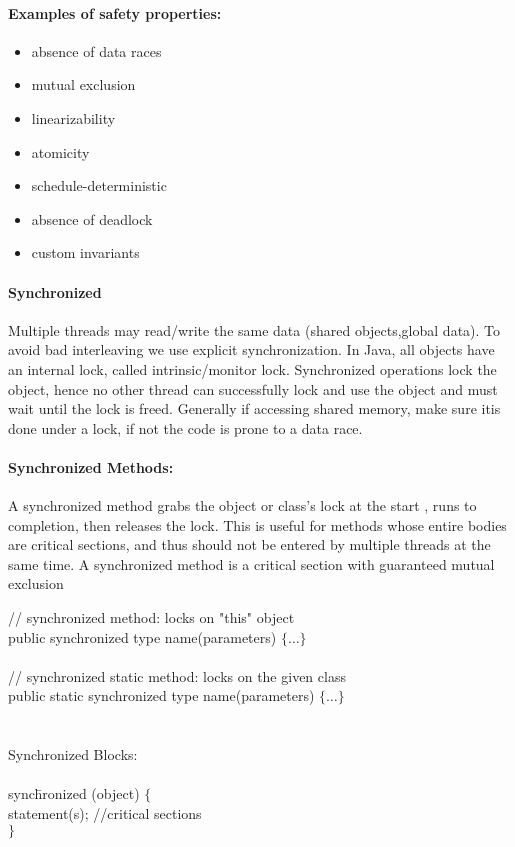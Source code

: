 \documentclass[8pt]{extreport}
\begin{document}
\paragraph{Examples of safety properties:}
\begin{itemize}
\item absence of data races
\item mutual exclusion
\item linearizability
\item atomicity
\item schedule-deterministic
\item absence of deadlock
\item custom invariants
\end{itemize}
\paragraph{Synchronized} Multiple threads may read/write the same data (shared objects,global data). To avoid bad interleaving we use explicit synchronization. In Java, all objects have an internal lock, called intrinsic/monitor lock. Synchronized operations lock the object, hence no other thread can successfully lock and use the object and must wait until the lock is freed. Generally if accessing shared memory, make sure itis done under a lock, if not the code is prone to a data race.
\paragraph{Synchronized Methods: } A synchronized method grabs the object or class's lock at the start , runs to completion, then releases the lock. This is useful for methods whose entire bodies are critical sections, and thus should not be entered by multiple threads at the same time. A synchronized method is a critical section with guaranteed mutual exclusion
\begin{snugshade*}
\begin{tabbing}
// synchronized method: locks on "this" object \\
public synchronized type name(parameters) $\{ \dots \}$\\
\\
// synchronized static method: locks on the given class\\
public static synchronized type name(parameters) $\{ \dots \}$\\
\\
\\
Synchronized Blocks:\\
\\
sync\=hronized (object) $\{$\\
\> statement(s); //critical sections\\
$\}$\\
\end{tabbing}
\end{snugshade*}
\end{document}
